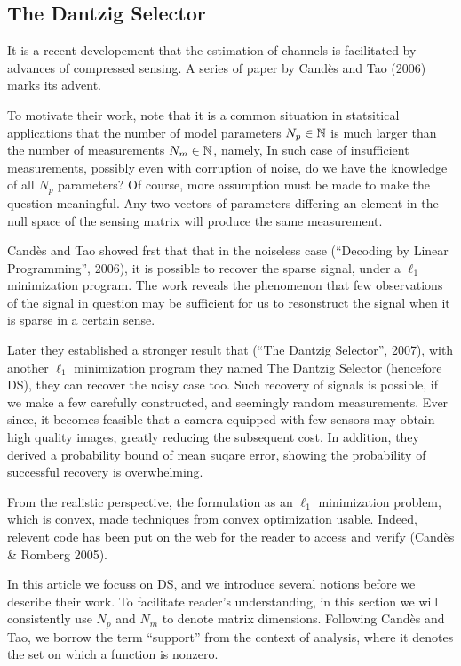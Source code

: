\subsection{The Dantzig Selector}

It is a recent developement that the estimation of channels is facilitated by advances of compressed sensing.
A series of paper by Cand\`es and Tao (2006) marks its advent.

To motivate their work, note that it is a common situation in statsitical applications that the number of model parameters \(N_p \in \mathbb{N}\) is much larger than the number of measurements \(N_m \in \mathbb{N}\), namely,
%
%
In such case of insufficient measurements, possibly even with corruption of noise, do we have the knowledge of all \(N_p\) parameters?
Of course, more assumption must be made to make the question meaningful.
Any two vectors of parameters differing an element in the null space of the sensing matrix will produce the same measurement.

Cand\`es and Tao showed frst that that in the noiseless case (``Decoding by Linear Programming'', 2006), it is possible to recover the sparse signal, under a \(\ell_1\) minimization program.
The work reveals the phenomenon that few observations of the signal in question may be sufficient for us to resonstruct the signal when it is sparse in a certain sense.

Later they established a stronger result that (``The Dantzig Selector'', 2007), with another \(\ell_1\) minimization program they named The Dantzig Selector (hencefore DS), they can recover the noisy case too.
Such recovery of signals is possible, if we make a few carefully constructed, and seemingly random measurements.
Ever since, it becomes feasible that a camera equipped with few sensors may obtain high quality images, greatly reducing the subsequent cost.
In addition, they derived a probability bound of mean suqare error, showing the probability of successful recovery is overwhelming.

From the realistic perspective, the formulation as an \(\ell_1\) minimization problem, which is convex, made techniques from convex optimization usable.
Indeed, relevent code has been put on the web for the reader to access and verify (Cand\`es \& Romberg 2005).

In this article we focuss on DS, and we introduce several notions before we describe their work.
To facilitate reader's understanding, in this section we will consistently use \(N_p\) and \(N_m\) to denote matrix dimensions.
Following Cand\`es and Tao, we borrow the term ``support'' from the context of analysis, where it denotes the set on which a function is nonzero.

